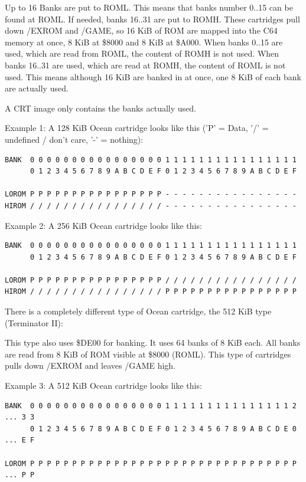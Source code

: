 \documentclass[a4paper,oneside]{memoir}
\begin{document}
Up to 16 Banks are put to ROML. This means that banks number 0..15 can be found
at ROML. If needed, banks 16..31 are put to ROMH. These cartridges pull down
/EXROM and /GAME, so 16 KiB of ROM are mapped into the C64 memory at once, 8
KiB at \$8000 and 8 KiB at \$A000.
When banks 0..15 are used, which are read from ROML, the content of ROMH is not
used. When banks 16..31 are used, which are read at ROMH, the content of ROML
is not used. This means although 16 KiB are banked in at once, one 8 KiB of
each bank are actually used.

A CRT image only contains the banks actually used.

Example 1: A 128 KiB Ocean cartridge looks like this ('P' = Data, '/' =
undefined / don't care, '-' = nothing):

\small
\begin{verbatim}
BANK  0 0 0 0 0 0 0 0 0 0 0 0 0 0 0 0 1 1 1 1 1 1 1 1 1 1 1 1 1 1 1 1
      0 1 2 3 4 5 6 7 8 9 A B C D E F 0 1 2 3 4 5 6 7 8 9 A B C D E F

LOROM P P P P P P P P P P P P P P P P - - - - - - - - - - - - - - - -
HIROM / / / / / / / / / / / / / / / / - - - - - - - - - - - - - - - -
\end{verbatim}
\normalsize

Example 2: A 256 KiB Ocean cartridge looks like this:

\small
\begin{verbatim}
BANK  0 0 0 0 0 0 0 0 0 0 0 0 0 0 0 0 1 1 1 1 1 1 1 1 1 1 1 1 1 1 1 1
      0 1 2 3 4 5 6 7 8 9 A B C D E F 0 1 2 3 4 5 6 7 8 9 A B C D E F

LOROM P P P P P P P P P P P P P P P P / / / / / / / / / / / / / / / /
HIROM / / / / / / / / / / / / / / / / P P P P P P P P P P P P P P P P
\end{verbatim}
\normalsize

There is a completely different type of Ocean cartridge, the 512 KiB type
(Terminator II):

This type also uses \$DE00 for banking. It uses 64 banks of 8 KiB each. All
banks are read from 8 KiB of ROM visible at \$8000 (ROML). This type of
cartridges pulls down /EXROM and leaves /GAME high.

Example 3: A 512 KiB Ocean cartridge looks like this:

\footnotesize
\begin{verbatim}
BANK  0 0 0 0 0 0 0 0 0 0 0 0 0 0 0 0 1 1 1 1 1 1 1 1 1 1 1 1 1 1 1 2 ... 3 3
      0 1 2 3 4 5 6 7 8 9 A B C D E F 0 1 2 3 4 5 6 7 8 9 A B C D E 0 ... E F

LOROM P P P P P P P P P P P P P P P P P P P P P P P P P P P P P P P P ... P P
\end{verbatim}
\normalsize
\end{document}
